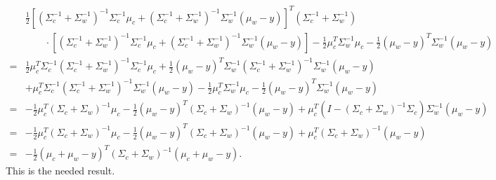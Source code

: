 \documentclass[10pt]{article}
\begin{document}
\begin{align*}
	&\frac{1}{2}\left[(\Sigma_c^{-1}+\Sigma_w^{-1})^{-1}\Sigma_c^{-1}\mu_c+(\Sigma_c^{-1}+\Sigma_w^{-1})^{-1}\Sigma_w^{-1}(\mu_w-y)\right]^T(\Sigma_c^{-1}+\Sigma_w^{-1}) \\
	&\qquad\cdot\left[(\Sigma_c^{-1}+\Sigma_w^{-1})^{-1}\Sigma_c^{-1}\mu_c+(\Sigma_c^{-1}+\Sigma_w^{-1})^{-1}\Sigma_w^{-1}(\mu_w-y)\right] - \frac{1}{2}\mu_c^T\Sigma_w^{-1}\mu_c - \frac{1}{2}(\mu_w-y)^T\Sigma_w^{-1}(\mu_w-y) \\
	= &\frac{1}{2}\mu_c^T\Sigma_c^{-1}(\Sigma_c^{-1}+\Sigma_w^{-1})^{-1}\Sigma_c^{-1}\mu_c + \frac{1}{2}(\mu_w-y)^T\Sigma_w^{-1}(\Sigma_c^{-1}+\Sigma_w^{-1})^{-1}\Sigma_w^{-1}(\mu_w-y) \\
	&+\mu_c^T\Sigma_c^{-1}(\Sigma_c^{-1}+\Sigma_w^{-1})^{-1}\Sigma_w^{-1}(\mu_w-y) - \frac{1}{2}\mu_c^T\Sigma_w^{-1}\mu_c - \frac{1}{2}(\mu_w-y)^T\Sigma_w^{-1}(\mu_w-y) \\
	= &-\frac{1}{2}\mu_c^T(\Sigma_c+\Sigma_w)^{-1}\mu_c - \frac{1}{2}(\mu_w-y)^T(\Sigma_c+\Sigma_w)^{-1}(\mu_w-y) + \mu_c^T(I-(\Sigma_c+\Sigma_w)^{-1}\Sigma_c)\Sigma_w^{-1}(\mu_w-y) \\ 
	= &-\frac{1}{2}\mu_c^T(\Sigma_c+\Sigma_w)^{-1}\mu_c - \frac{1}{2}(\mu_w-y)^T(\Sigma_c+\Sigma_w)^{-1}(\mu_w-y) + \mu_c^T(\Sigma_c+\Sigma_w)^{-1}(\mu_w-y) \\
	= &-\frac{1}{2}(\mu_c+\mu_w-y)^T(\Sigma_c+\Sigma_w)^{-1}(\mu_c+\mu_w-y).
\end{align*}
This is the needed result.
\end{document}
